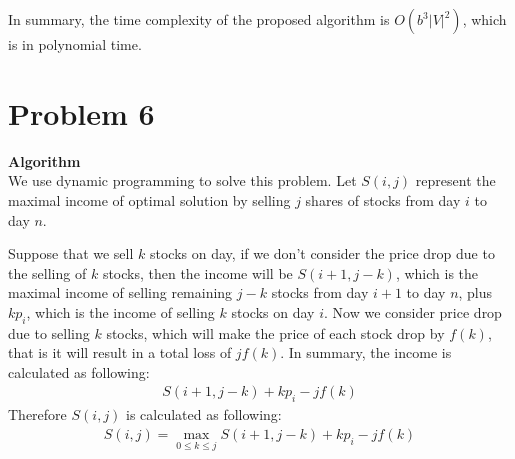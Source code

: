 \documentclass{article}
\newcommand{\Algorithm}{\textbf{Algorithm} \\}
\begin{document}
In summary, the time complexity of the proposed algorithm is $O(b^3 |V|^2)$, which is in polynomial
time.

\section*{Problem 6}
\Algorithm
We use dynamic programming to solve this problem. Let $S(i, j)$ represent the maximal income of
optimal solution by selling $j$ shares of stocks from day $i$ to day $n$.

Suppose that we sell $k$ stocks on day, if we don't consider the price drop due to the selling of
$k$ stocks, then the income will be $ S(i+1, j-k)$, which is the maximal income of selling remaining 
$j-k$ stocks from day $i+1$ to day $n$, plus $k p_i$, which is the income of selling $k$ stocks on
day $i$. Now we consider price drop due to selling $k$ stocks, which will make the price of each
stock drop by $f(k)$, that is it will result in a total loss of $jf(k)$. In summary, the income
is calculated as following:
\begin{align}
  S(i+1, j - k) + k p_i - jf(k) 
\end{align}
Therefore $S(i, j)$ is calculated as following:
\begin{align}
  S(i, j) = \max_{0 \leq k \leq j} S(i+1, j-k) + k p_i - jf(k)
\end{align}
\end{document}

